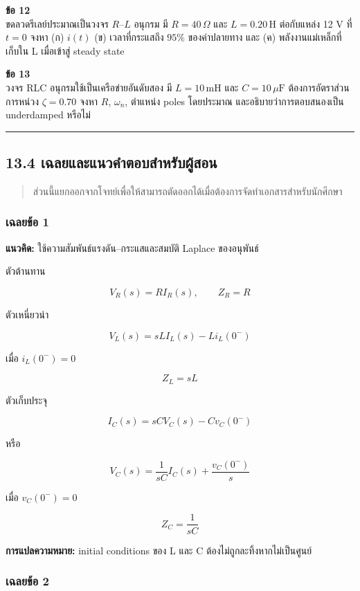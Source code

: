 \textbf{ข้อ 12}\\
ขดลวดรีเลย์ประมาณเป็นวงจร $R$–$L$ อนุกรม มี $R=40\,\Omega$ และ $L=0.20\,\text{H}$ ต่อกับแหล่ง 12 V ที่ $t=0$ จงหา (ก) $i(t)$ (ข) เวลาที่กระแสถึง $95\%$ ของค่าปลายทาง และ (ค) พลังงานแม่เหล็กที่เก็บใน L เมื่อเข้าสู่ steady state

\textbf{ข้อ 13}\\
วงจร RLC อนุกรมใช้เป็นเครือข่ายอันดับสอง มี $L=10\,\text{mH}$ และ $C=10\,\mu\text{F}$ ต้องการอัตราส่วนการหน่วง $\zeta=0.70$ จงหา $R$, $\omega_n$, ตำแหน่ง poles โดยประมาณ และอธิบายว่าการตอบสนองเป็น underdamped หรือไม่

\par\noindent\rule{\textwidth}{0.4pt}\par

\subsection{13.4 เฉลยและแนวคำตอบสำหรับผู้สอน}

\begin{quote}
ส่วนนี้แยกออกจากโจทย์เพื่อให้สามารถตัดออกได้เมื่อต้องการจัดทำเอกสารสำหรับนักศึกษา
\end{quote}

\subsubsection{เฉลยข้อ 1}

\textbf{แนวคิด:} ใช้ความสัมพันธ์แรงดัน–กระแสและสมบัติ Laplace ของอนุพันธ์

ตัวต้านทาน

\[
V_R(s)=RI_R(s),\qquad Z_R=R
\]

ตัวเหนี่ยวนำ

\[
V_L(s)=sLI_L(s)-Li_L(0^-)
\]

เมื่อ $i_L(0^-)=0$

\[
Z_L=sL
\]

ตัวเก็บประจุ

\[
I_C(s)=sCV_C(s)-Cv_C(0^-)
\]

หรือ

\[
V_C(s)=\frac{1}{sC}I_C(s)+\frac{v_C(0^-)}{s}
\]

เมื่อ $v_C(0^-)=0$

\[
Z_C=\frac{1}{sC}
\]

\textbf{การแปลความหมาย:} initial conditions ของ L และ C ต้องไม่ถูกละทิ้งหากไม่เป็นศูนย์

\subsubsection{เฉลยข้อ 2}

